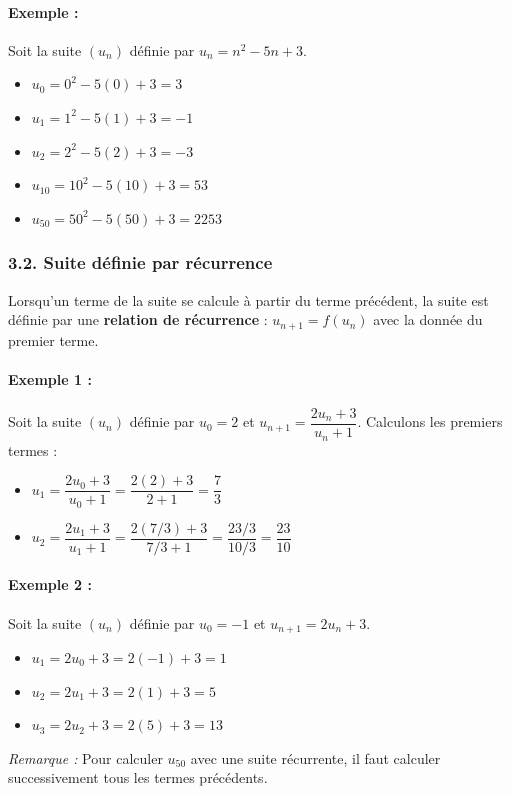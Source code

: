 \documentclass[12pt,a4paper]{article}
\begin{document}
\paragraph{Exemple :}
Soit la suite $(u_n)$ définie par $u_n = n^2 - 5n + 3$.
\begin{itemize}[label=$\bullet$]
    \item $u_0 = 0^2 - 5(0) + 3 = 3$
    \item $u_1 = 1^2 - 5(1) + 3 = -1$
    \item $u_2 = 2^2 - 5(2) + 3 = -3$
    \item $u_{10} = 10^2 - 5(10) + 3 = 53$
    \item $u_{50} = 50^2 - 5(50) + 3 = 2253$
\end{itemize}

\subsubsection*{\color{myblue}3.2. Suite définie par récurrence}
Lorsqu'un terme de la suite se calcule à partir du terme précédent, la suite est définie par une \textbf{relation de récurrence} : $u_{n+1} = f(u_n)$ avec la donnée du premier terme.

\paragraph{Exemple 1 :}
Soit la suite $(u_n)$ définie par $u_0 = 2$ et $u_{n+1} = \dfrac{2u_n + 3}{u_n + 1}$.
Calculons les premiers termes :
\begin{itemize}[label=$\bullet$]
    \item $u_1 = \dfrac{2u_0 + 3}{u_0 + 1} = \dfrac{2(2) + 3}{2 + 1} = \dfrac{7}{3}$
    \item $u_2 = \dfrac{2u_1 + 3}{u_1 + 1} = \dfrac{2(7/3) + 3}{7/3 + 1} = \dfrac{23/3}{10/3} = \dfrac{23}{10}$
\end{itemize}

\paragraph{Exemple 2 :}
Soit la suite $(u_n)$ définie par $u_0 = -1$ et $u_{n+1} = 2u_n + 3$.
\begin{itemize}[label=$\bullet$]
    \item $u_1 = 2u_0 + 3 = 2(-1) + 3 = 1$
    \item $u_2 = 2u_1 + 3 = 2(1) + 3 = 5$
    \item $u_3 = 2u_2 + 3 = 2(5) + 3 = 13$
\end{itemize}
\textit{Remarque :} Pour calculer $u_{50}$ avec une suite récurrente, il faut calculer successivement tous les termes précédents.
\end{document}
